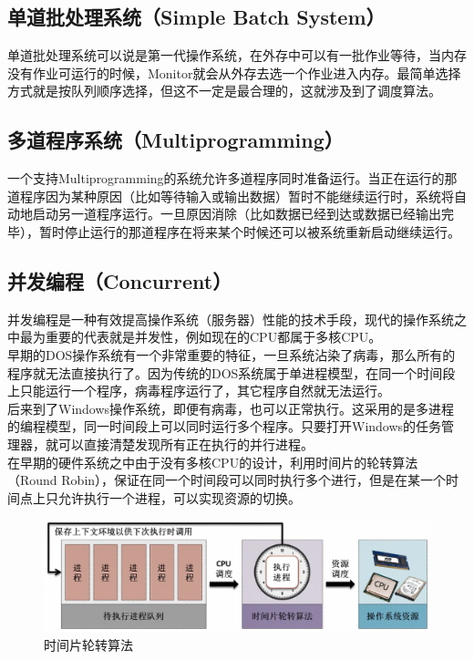 \vspace{0.5cm}

\subsection{单道批处理系统（Simple Batch System）}

单道批处理系统可以说是第一代操作系统，在外存中可以有一批作业等待，当内存没有作业可运行的时候，Monitor就会从外存去选一个作业进入内存。最简单选择方式就是按队列顺序选择，但这不一定是最合理的，这就涉及到了调度算法。\\

\subsection{多道程序系统（Multiprogramming）}

一个支持Multiprogramming的系统允许多道程序同时准备运行。当正在运行的那道程序因为某种原因（比如等待输入或输出数据）暂时不能继续运行时，系统将自动地启动另一道程序运行。一旦原因消除（比如数据已经到达或数据已经输出完毕），暂时停止运行的那道程序在将来某个时候还可以被系统重新启动继续运行。\\

\subsection{并发编程（Concurrent）}

并发编程是一种有效提高操作系统（服务器）性能的技术手段，现代的操作系统之中最为重要的代表就是并发性，例如现在的CPU都属于多核CPU。\\

早期的DOS操作系统有一个非常重要的特征，一旦系统沾染了病毒，那么所有的程序就无法直接执行了。因为传统的DOS系统属于单进程模型，在同一个时间段上只能运行一个程序，病毒程序运行了，其它程序自然就无法运行。\\

后来到了Windows操作系统，即便有病毒，也可以正常执行。这采用的是多进程的编程模型，同一时间段上可以同时运行多个程序。只要打开Windows的任务管理器，就可以直接清楚发现所有正在执行的并行进程。\\

在早期的硬件系统之中由于没有多核CPU的设计，利用时间片的轮转算法（Round Robin），保证在同一个时间段可以同时执行多个进行，但是在某一个时间点上只允许执行一个进程，可以实现资源的切换。

\begin{figure}[H]
	\centering
	\includegraphics[scale=0.6]{img/C1/1-6/1.png}
	\caption{时间片轮转算法}
\end{figure}

